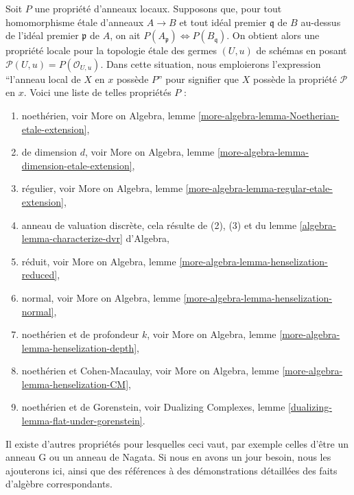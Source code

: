 \begin{remark}
\label{remark-list-properties-local-ring-local-etale-topology}
Soit $P$ une propriété d'anneaux locaux. Supposons que, pour tout
homomorphisme \'etale d'anneaux $A \to B$ et tout idéal premier $\mathfrak q$ de $B$ au-dessus de
l'idéal premier $\mathfrak p$ de $A$, on ait
$P(A_\mathfrak p) \Leftrightarrow P(B_\mathfrak q)$.
On obtient alors une propriété locale pour la topologie \'etale des germes $(U, u)$ de schémas
en posant $\mathcal{P}(U, u) = P(\mathcal{O}_{U, u})$.
Dans cette situation, nous emploierons l'expression
``l'anneau local de $X$ en $x$ possède $P$'' pour signifier que
$X$ possède la propriété $\mathcal{P}$ en $x$.
Voici une liste de telles propriétés $P$ :
\begin{enumerate}
\item noethérien, voir
More on Algebra, lemme \ref{more-algebra-lemma-Noetherian-etale-extension},
\item de dimension $d$, voir
More on Algebra, lemme \ref{more-algebra-lemma-dimension-etale-extension},
\item régulier, voir
More on Algebra, lemme \ref{more-algebra-lemma-regular-etale-extension},
\item anneau de valuation discrète, cela résulte de (2), (3) et du
lemme \ref{algebra-lemma-characterize-dvr} d'Algebra,
\item réduit, voir
More on Algebra, lemme \ref{more-algebra-lemma-henselization-reduced},
\item normal, voir
More on Algebra, lemme \ref{more-algebra-lemma-henselization-normal},
\item noethérien et de profondeur $k$, voir
More on Algebra, lemme \ref{more-algebra-lemma-henselization-depth},
\item noethérien et Cohen-Macaulay, voir
More on Algebra, lemme \ref{more-algebra-lemma-henselization-CM},
\item noethérien et de Gorenstein, voir
Dualizing Complexes, lemme \ref{dualizing-lemma-flat-under-gorenstein}.
\end{enumerate}
Il existe d'autres propriétés pour lesquelles ceci vaut, par exemple celles d'être un anneau G ou un
anneau de Nagata. Si nous en avons un jour besoin, nous les ajouterons ici,
ainsi que des références à des démonstrations détaillées des faits
d'algèbre correspondants.
\end{remark}







